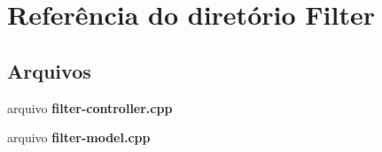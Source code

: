 \section{Referência do diretório Filter}
\label{dir_e40b6090915084ad16b119a58188202a}
\subsection*{Arquivos}
\begin{DoxyCompactItemize}
\item 
arquivo {\bf filter-\/controller.\+cpp}
\item 
arquivo {\bf filter-\/model.\+cpp}
\end{DoxyCompactItemize}
